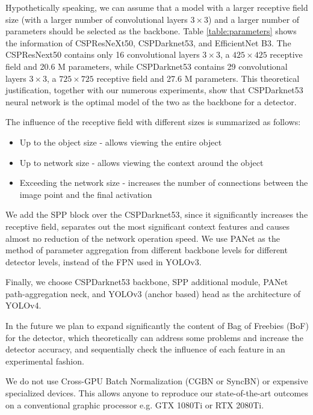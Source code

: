 \documentclass[10pt,twocolumn,letterpaper]{article}
\begin{document}
Hypothetically speaking, we can assume that a model with a larger receptive field size (with a larger number of convolutional layers $3 \times 3$) and a larger number of parameters should be selected as the backbone. Table \ref{table:parameters} shows the information of CSPResNeXt50, CSPDarknet53, and EfficientNet B3. The CSPResNext50 contains only 16 convolutional layers $3 \times 3$, a $425 \times 425$ receptive field and 20.6 M parameters, while CSPDarknet53 contains 29 convolutional layers $3 \times 3$, a $725 \times 725$ receptive field and 27.6 M parameters. This theoretical justification, together with our numerous experiments, show that CSPDarknet53 neural network is the optimal model of the two as the backbone for a detector.

The influence of the receptive field with different sizes is summarized as follows:

\begin{itemize}
	\item Up to the object size - allows viewing the entire object
	\item Up to network size - allows viewing the context around the object
	\item Exceeding the network size - increases the number of connections between the image point and the final activation
\end{itemize}

We add the SPP block over the CSPDarknet53, since it significantly increases the receptive field, separates out the most significant context features and causes almost no reduction of the network operation speed. We use PANet as the method of parameter aggregation from different backbone levels for different detector levels, instead of the FPN used in YOLOv3.

Finally, we choose CSPDarknet53 backbone, SPP additional module, PANet path-aggregation neck, and YOLOv3 (anchor based) head as the architecture of YOLOv4.

In the future we plan to expand significantly the content of Bag of Freebies (BoF) for the detector, which theoretically can address some problems and increase the detector accuracy, and sequentially check the influence of each feature in an experimental fashion.

We do not use Cross-GPU Batch Normalization (CGBN or SyncBN) or expensive specialized devices. This allows anyone to reproduce our state-of-the-art outcomes on a conventional graphic processor e.g. GTX 1080Ti or RTX 2080Ti.
\end{document}
